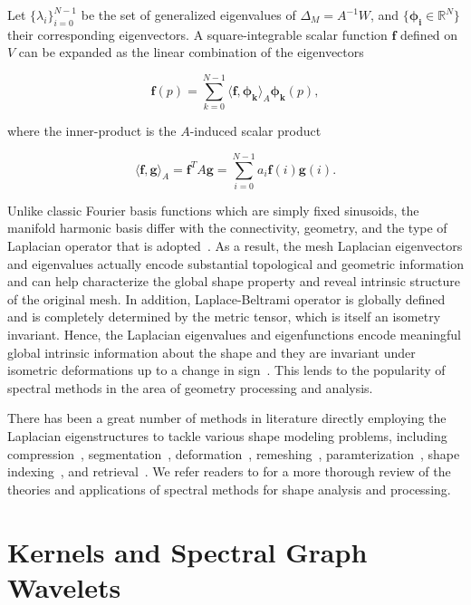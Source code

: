 Let $\{\lambda_i\}_{i=0}^{N-1}$ be the set of generalized eigenvalues of
$\Delta_M=A^{-1}W$, and $\{\mathbf{\phi_i}\in\mathbb{R}^N\}$ their corresponding
eigenvectors. A square-integrable scalar function $\mathbf{f}$ defined on $V$ can
be expanded as the linear combination of the eigenvectors

\begin{equation}
\mathbf{f}(p)=\sum_{k=0}^{N-1}\langle \mathbf{f},\mathbf{\phi_k}\rangle_A \mathbf{\phi_k}(p),
\end{equation}

where the inner-product is the $A$-induced scalar product

\begin{equation}
\langle \mathbf{f},\mathbf{g}\rangle_A = \mathbf{f}^T A\mathbf{g}=\sum_{i=0}^{N-1}a_i \mathbf{f}(i)\mathbf{g}(i).
\end{equation}

Unlike classic Fourier basis functions which are simply fixed sinusoids, the
manifold harmonic basis differ with the connectivity, geometry, and the type
of Laplacian operator that is adopted~\cite{Zhang:2010:CGF}. As a result, the
mesh Laplacian eigenvectors and eigenvalues actually encode substantial topological
and geometric information and can help characterize the global shape property and
reveal intrinsic structure of the original mesh. In addition, Laplace-Beltrami
operator is globally defined and is completely determined by the metric tensor,
which is itself an isometry invariant. Hence, the Laplacian eigenvalues and eigenfunctions
encode meaningful global intrinsic information about the shape and they are invariant
under isometric deformations up to a change in sign~\cite{Rustamov:2007:LEF,Sun:2009:CGF}.
This lends to the popularity of spectral methods in the area of geometry processing
and analysis.

There has been a great number of methods in literature directly employing the Laplacian eigenstructures
to tackle various shape modeling problems, including compression~\cite{Karni2000},
segmentation~\cite{Liu2007}, deformation~\cite{Rong2008}, remeshing~\cite{dong2006spectral},
paramterization~\cite{Zhou2004}, shape indexing~\cite{Reuter:2006:CAD, Rustamov:2007:LEF},
and retrieval~\cite{Lavoue:2012}. We refer readers to \cite{Zhang:2010:CGF} for a more thorough
review of the theories and applications of spectral methods for shape analysis and processing.

\section{Kernels and Spectral Graph Wavelets}

